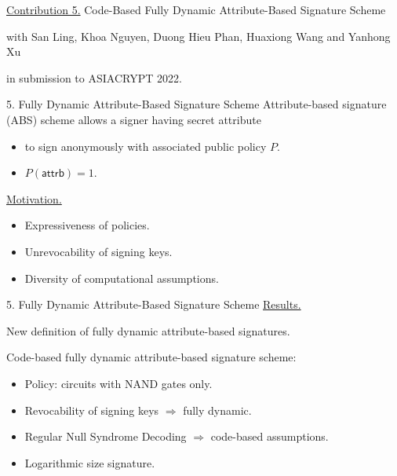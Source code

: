 \begin{frame}
	\underline{Contribution 5.} Code-Based Fully Dynamic Attribute-Based Signature Scheme
	
	{\small with San Ling, Khoa Nguyen, Duong Hieu Phan, Huaxiong Wang and Yanhong Xu}
	
	in submission to ASIACRYPT 2022.
\end{frame}

\begin{frame}{5. Fully Dynamic Attribute-Based Signature Scheme}
	Attribute-based signature (ABS) scheme allows a signer having secret attribute\pause
	\begin{itemize}
		\item to sign anonymously with associated public policy $P$.\pause
		\item $P(\textsf{attrb}) = 1$.\pause
	\end{itemize}
	
	\underline{Motivation.}\pause
	\begin{itemize}
		\item Expressiveness of policies.\pause
		\item Unrevocability of signing keys.\pause
		\item Diversity of computational assumptions.
	\end{itemize}
\end{frame}

\begin{frame}{5. Fully Dynamic Attribute-Based Signature Scheme}
	\underline{Results.} \pause
	
	New definition of fully dynamic attribute-based signatures.\pause
	
	Code-based fully dynamic attribute-based signature scheme:\pause
	\begin{itemize}
		\item Policy: circuits with NAND gates only.\pause
		\item Revocability of signing keys $\Rightarrow$ fully dynamic.\pause
		\item Regular Null Syndrome Decoding $\Rightarrow$ code-based assumptions.\pause
		\item Logarithmic size signature.
	\end{itemize}
\end{frame}

